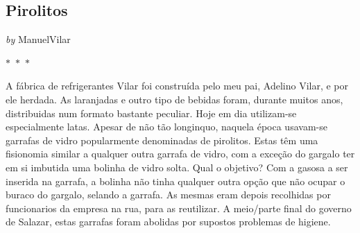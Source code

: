 \documentclass{article}
\begin{document}
\newpage

\begin{center}
\section{Pirolitos}
\vspace{0.5cm}

    
        \textit{by} ManuelVilar
    

\vspace{0.75cm}
 
    
\vspace{0.75cm}
    $\ast$~$\ast$~$\ast$  


    \begin{center}
        \begin{minipage}{0.9\textwidth}
            \setlength{\parskip}{0.2cm}
            \setlength{\parindent}{0cm}
            \fontsize{12pt}{14pt}\selectfont
            


A fábrica de refrigerantes Vilar foi construída pelo meu pai, Adelino Vilar, e por ele
herdada. As laranjadas e outro tipo de bebidas foram, durante muitos anos, distribuidas num
formato bastante peculiar. Hoje em dia utilizam-se especialmente
latas. Apesar de não tão longinquo, naquela época usavam-se garrafas de
vidro popularmente denominadas de pirolitos. Estas têm uma fisionomia
similar a qualquer outra garrafa de vidro, com a exceção do gargalo ter
em si imbutida uma bolinha de vidro solta. Qual o objetivo? Com a gasosa
a ser inserida na garrafa, a bolinha não tinha qualquer outra opção que
não ocupar o buraco do gargalo, selando a garrafa. As mesmas eram depois
recolhidas por funcionarios da empresa na rua, para as reutilizar. A
meio/parte final do governo de Salazar, estas garrafas foram abolidas
por supostos problemas de higiene.

        \end{minipage}
    \end{center}
\end{center}
    
\end{document}
